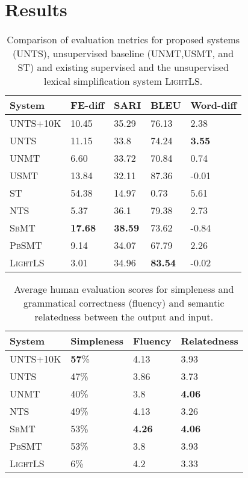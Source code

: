 \documentclass[11pt,a4paper]{article}
\begin{document}
%
 \section{Results}
\label{sec:result}
\begin{table}
\footnotesize
\begin{tabular}{lllll}
\toprule
\textbf{System} & \textbf{FE-diff} & \textbf{SARI} & \textbf{BLEU} & \textbf{Word-diff} \\
\midrule
\textsc{UNTS}+10K & 10.45 & 35.29 & 76.13 & 2.38 \\ 
\textsc{UNTS} & 11.15 & 33.8 & 74.24 & \textbf{3.55} \\
\midrule
\textsc{UNMT} & 6.60 & 33.72 & 70.84 & 0.74 \\
\textsc{USMT} & 13.84 & 32.11 & 87.36 & -0.01\\
\textsc{ST} & 54.38 & 14.97 & 0.73 & 5.61\\
\midrule
\textsc{NTS} & 5.37 & 36.1 & 79.38 & 2.73 \\
\textsc{SbMT} & \textbf{17.68} & \textbf{38.59} & 73.62 & -0.84 \\
\textsc{PbSMT} & 9.14 & 34.07 & 67.79 & 2.26 \\
\midrule
\textsc{LightLS} & 3.01 & 34.96 & \textbf{83.54} & -0.02 \\ \bottomrule
\end{tabular}
\caption{Comparison of evaluation metrics for proposed systems (\textsc{UNTS}), unsupervised baseline (\textsc{UNMT},\textsc{USMT}, and \textsc{ST}) and existing supervised and the unsupervised lexical simplification system \textsc{LightLS}.}
\label{tab:results} 
\end{table}
\begin{table}[t]
\footnotesize
\begin{tabular}{llll}
\toprule
\textbf{System} & \textbf{Simpleness} & \textbf{Fluency} & \textbf{Relatedness}\\
\midrule
\textsc{UNTS}+10K & \textbf{57}\% & 4.13 & 3.93 \\ 
\textsc{UNTS} & 47\% & 3.86 & 3.73 \\
\midrule
\textsc{UNMT} & 40\% & 3.8 & \textbf{4.06} \\
\midrule
\textsc{NTS} & 49\% & 4.13 & 3.26 \\
\textsc{SbMT} & 53\% & \textbf{4.26} & \textbf{4.06} \\
\textsc{PbSMT} & 53\% & 3.8 & 3.93 \\
\midrule
\textsc{LightLS} & 6\% & 4.2 & 3.33 \\ \bottomrule
\end{tabular}
\caption{Average human evaluation scores for simpleness and grammatical correctness (fluency) and semantic relatedness between the output and input.}
\label{tab:Human} 
\end{table}
\end{document}
